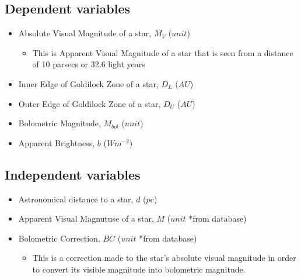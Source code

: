 \documentclass[a4paper,12pt]{article}
\begin{document}
\subsection{Dependent variables}
  
  \begin{itemize}

    \item Absolute Visual Magnitude of a star, $M_V$ ($unit$)

      \begin{itemize}

        \item This is Apparent Visual Magnitude of a star that is seen from a distance of 10 parsecs or 32.6 light years
        
        \end{itemize}
      
    \item Inner Edge of Goldilock Zone of a star, $D_L$ ($AU$) 

      \item Outer Edge of Goldilock Zone of a star, $D_U$ ($AU$)

        \item Bolometric Magnitude, $M_{bol}$ ($unit$)
          
          \item Apparent Brightness, $b$ ($W m^{-2}$)
          
  \end{itemize}


  \subsection{Independent variables}

  \begin{itemize}

  \item Astronomical distance to a star, $d$ ($pc$)
    
  \item Apparent Visual Magnutuse of a star, $M$ ($unit$ *from database)

    \item Bolometric Correction, $BC$ ($unit$ *from database)

            \begin{itemize}

            \item This is a correction made to the star's absolute visual magnitude in order to convert its
              visible magnitude into bolometric magnitude.
        
        \end{itemize}

      
\end{itemize}
  
\end{document}

